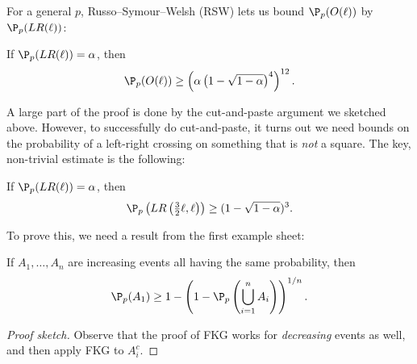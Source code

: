 \documentclass[a4paper]{article}
\begin{document}
For a general $p$, Russo--Symour--Welsh (RSW) lets us bound $\P_p(O(\ell))$ by $\P_p(LR(\ell))$:
\begin{thm}
  If $\P_p(LR(\ell)) = \alpha$, then
  \[
    \P_p(O(\ell)) \geq \left(\alpha \left(1 - \sqrt{1 - \alpha}\right)^4\right)^{12}.
  \]
\end{thm}

A large part of the proof is done by the cut-and-paste argument we sketched above. However, to successfully do cut-and-paste, it turns out we need bounds on the probability of a left-right crossing on something that is \emph{not} a square. The key, non-trivial estimate is the following:
\begin{lemma}
  If $\P_p(LR(\ell)) = \alpha$, then
  \[
    \P_p\left(LR\left(\tfrac{3}{2}\ell, \ell\right)\right) \geq (1 - \sqrt{1 - \alpha})^3.
  \]
\end{lemma}

To prove this, we need a result from the first example sheet:
\begin{lemma}
  If $A_1, \ldots, A_n$ are increasing events all having the same probability, then
  \[
    \P_p(A_1) \geq 1 - \left(1 - \P_p\left(\bigcup_{i = 1}^n A_i\right)\right)^{1/n}.
  \]
\end{lemma}

\begin{proof}[Proof sketch]
  Observe that the proof of FKG works for \emph{decreasing} events as well, and then apply FKG to $A_i^c$.
\end{proof}
\end{document}
